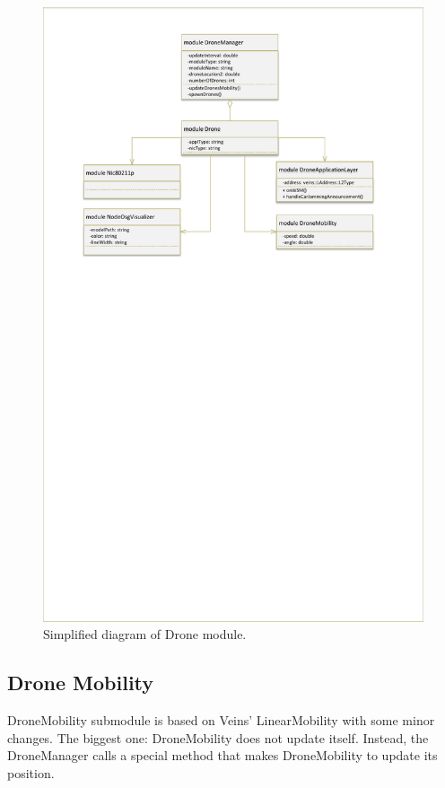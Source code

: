 \documentclass[]{nsm-thesis}
\begin{document}
\begin{figure}
	\centering
	\includegraphics[width=1\textwidth]{figures/Drone.pdf}
	\caption{Simplified diagram of Drone module.}
	\label{fig:dronened}
\end{figure}

\subsection{Drone Mobility}

DroneMobility submodule is based on Veins' LinearMobility with some minor changes. The biggest one: DroneMobility does not update itself. Instead, the DroneManager calls a special method that makes DroneMobility to update its position.
\end{document}
